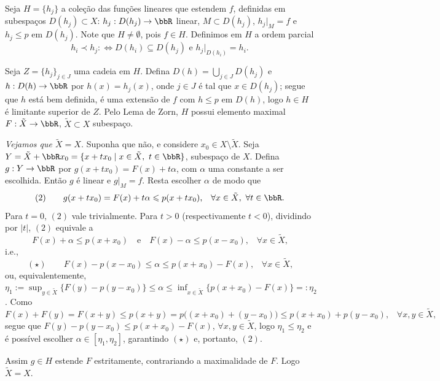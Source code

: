 \begin{myproof}
	Seja $H=\{h_j\}$ a coleção das funções lineares que estendem $f$, definidas em subespaços
	$D(h_j)\subset X$: $h_j:D(h_j)\to\bbR$ linear, $M\subset D(h_j)$, $h_j|_M=f$ e $h_j\leq p$ em
	$D(h_j)$. Note que $H\neq\emptyset$, pois $f\in H$. Definimos em $H$ a ordem parcial
	$$h_i\prec h_j :\iff D(h_i)\subseteq D(h_j) \text{ e } h_j|_{D(h_i)}=h_i\text{.}$$

	Seja $Z=\{h_j\}_{j\in J}$ uma cadeia em $H$. Defina $D(h)=\bigcup_{j\in J}D(h_j)$ e $h:D(h)\to\bbR$
	por $h(x)=h_j(x)$, onde $j\in J$ é tal que $x\in D(h_j)$; segue que $h$ está bem definida, é uma
	extensão de $f$ com $h\leq p$ em $D(h)$, logo $h\in H$ é limitante superior de $Z$. Pelo Lema de
	Zorn, $H$ possui elemento maximal $F:\tilde X\to\bbR$, $\tilde X\subset X$ subespaço.

	\textit{Vejamos que $\tilde X=X$.} Suponha que não, e considere $x_0\in X\setminus\tilde X$. Seja
	$Y=\tilde X+\bbR x_0=\{x+tx_0 \mid x\in\tilde X,\ t\in\bbR\}$, subespaço de $X$. Defina
	$g:Y\to\bbR$ por $g(x+tx_0)=F(x)+t\alpha$, com $\alpha$ uma constante a ser escolhida. Então $g$ é
	linear e $g|_M=f$. Resta escolher $\alpha$ de modo que
	$$(2)\qquad g(x+tx_0)=F(x)+t\alpha\leq p(x+tx_0)\text{,}\quad\forall x\in\tilde X,\ \forall t\in\bbR\text{.}$$
	Para $t=0$, $(2)$ vale trivialmente. Para $t>0$ (respectivamente $t<0$), dividindo por $|t|$, $(2)$
	equivale a
	$$F(x)+\alpha\leq p(x+x_0) \quad\text{e}\quad F(x)-\alpha\leq p(x-x_0)\text{,}\quad\forall x\in\tilde
	X\text{,}$$
	i.e.,
	$$(\star)\qquad F(x)-p(x-x_0)\leq\alpha\leq p(x+x_0)-F(x)\text{,}\quad\forall x\in\tilde X\text{,}$$
	ou, equivalentemente, $\eta_1:=\sup_{y\in\tilde X}\{F(y)-p(y-x_0)\}\leq\alpha\leq
	\inf_{x\in\tilde X}\{p(x+x_0)-F(x)\}=:\eta_2$. Como
	$$F(x)+F(y)=F(x+y)\leq p(x+y)=p\big((x+x_0)+(y-x_0)\big)\leq p(x+x_0)+p(y-x_0)\text{,}\quad\forall
	x,y\in\tilde X\text{,}$$
	segue que $F(y)-p(y-x_0)\leq p(x+x_0)-F(x)$, $\forall x,y\in\tilde X$, logo $\eta_1\leq\eta_2$ e é
	possível escolher $\alpha\in[\eta_1,\eta_2]$, garantindo $(\star)$ e, portanto, $(2)$.

	Assim $g\in H$ estende $F$ estritamente, contrariando a maximalidade de $F$. Logo $\tilde X=X$.
\end{myproof}

